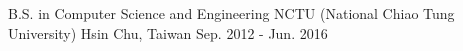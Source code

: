 

\begin{cventries}


  \cventry
    {B.S. in Computer Science and Engineering}
    {NCTU (National Chiao Tung University)}
    {Hsin Chu, Taiwan}
    {Sep. 2012 - Jun. 2016}
    {}

\end{cventries}
